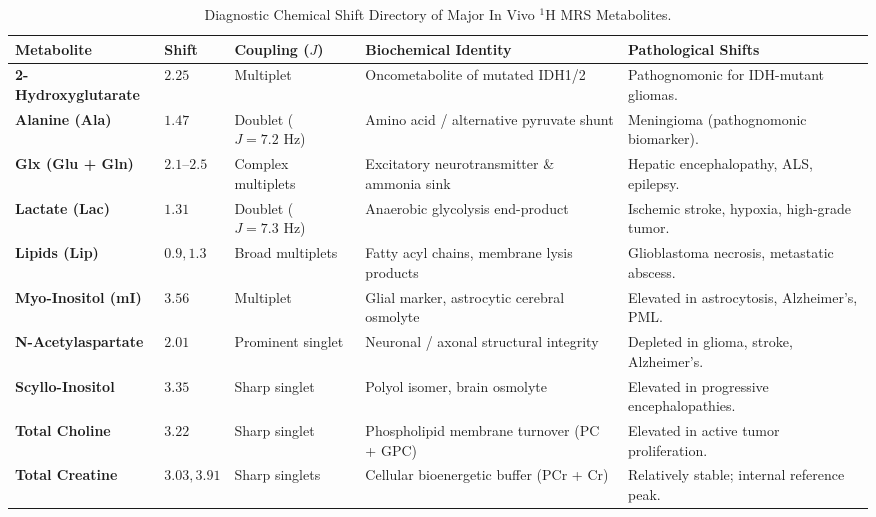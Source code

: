 \documentclass[11pt,a4paper]{article}
\begin{document}
\begin{table}[htbp]
\centering
\small
\setlength{\tabcolsep}{2.5pt}
\caption{Diagnostic Chemical Shift Directory of Major In Vivo $^1\text{H}$ MRS Metabolites.}
\label{tab:metabolite_directory}
\begin{tabular}{p{3.2cm} p{1.4cm} p{1.8cm} p{3.4cm} p{4.4cm}}
\toprule
\textbf{Metabolite} & \textbf{Shift} & \textbf{Coupling ($J$)} & \textbf{Biochemical Identity} & \textbf{Pathological Shifts} \\
\midrule
\textbf{2-Hydroxyglutarate} & $2.25$ & Multiplet & Oncometabolite of mutated IDH1/2 & Pathognomonic for IDH-mutant gliomas. \\
\addlinespace
\textbf{Alanine (Ala)} & $1.47$ & Doublet ($J=7.2\text{ Hz}$) & Amino acid / alternative pyruvate shunt & Meningioma (pathognomonic biomarker). \\
\addlinespace
\textbf{Glx (Glu + Gln)} & $2.1\text{--}2.5$ & Complex multiplets & Excitatory neurotransmitter \& ammonia sink & Hepatic encephalopathy, ALS, epilepsy. \\
\addlinespace
\textbf{Lactate (Lac)} & $1.31$ & Doublet ($J=7.3\text{ Hz}$) & Anaerobic glycolysis end-product & Ischemic stroke, hypoxia, high-grade tumor. \\
\addlinespace
\textbf{Lipids (Lip)} & $0.9, 1.3$ & Broad multiplets & Fatty acyl chains, membrane lysis products & Glioblastoma necrosis, metastatic abscess. \\
\addlinespace
\textbf{Myo-Inositol (mI)} & $3.56$ & Multiplet & Glial marker, astrocytic cerebral osmolyte & Elevated in astrocytosis, Alzheimer's, PML. \\
\addlinespace
\textbf{N-Acetylaspartate} & $2.01$ & Prominent singlet & Neuronal / axonal structural integrity & Depleted in glioma, stroke, Alzheimer's. \\
\addlinespace
\textbf{Scyllo-Inositol} & $3.35$ & Sharp singlet & Polyol isomer, brain osmolyte & Elevated in progressive encephalopathies. \\
\addlinespace
\textbf{Total Choline} & $3.22$ & Sharp singlet & Phospholipid membrane turnover (PC + GPC) & Elevated in active tumor proliferation. \\
\addlinespace
\textbf{Total Creatine} & $3.03, 3.91$ & Sharp singlets & Cellular bioenergetic buffer (PCr + Cr) & Relatively stable; internal reference peak. \\
\bottomrule
\end{tabular}
\end{table}
\end{document}
